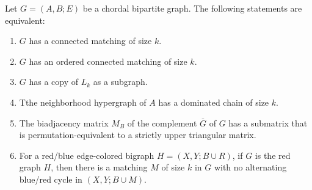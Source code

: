 \begin{theorem}
Let $G= (A,B; E)$ be a chordal bipartite graph.  The following statements are equivalent:
\begin{enumerate}
	\item $G$ has a connected matching of size $k$.
	\item $G$ has an ordered connected matching of size $k$.
	\item $G$ has a copy of $L_k$ as a subgraph.
	\item Tthe neighborhood hypergraph of $A$ has a dominated chain of size $k$.
	\item The biadjacency matrix $M_B$ of the complement $\overline{G}$ of $G$ has a submatrix that is permutation-equivalent to a strictly upper triangular matrix.
	\item For a red/blue edge-colored bigraph $H = (X,Y;B\cup R)$, if $G$ is the red graph $H$, then there is a matching $M$ of size $k$ in $G$ with no alternating blue/red cycle in $(X,Y;B\cup M)$.
\end{enumerate}
\end{theorem}

